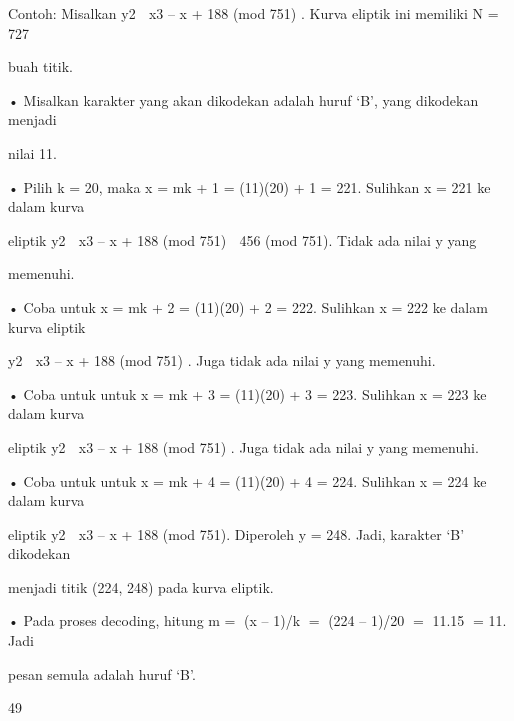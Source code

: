 \documentclass{article}
\begin{document}

Contoh: Misalkan y2  x3 – x  + 188  (mod 751) . Kurva eliptik ini memiliki N = 727 

buah titik. 

• Misalkan karakter yang akan dikodekan adalah huruf ‘B’, yang dikodekan menjadi 

nilai 11. 

• Pilih k = 20, maka x = mk + 1 = (11)(20) + 1 = 221. Sulihkan x = 221 ke dalam kurva 

eliptik y2  x3 – x  + 188  (mod 751)  456 (mod 751). Tidak ada nilai y yang 

memenuhi. 

• Coba untuk x = mk + 2 = (11)(20) + 2 = 222. Sulihkan x = 222 ke dalam kurva eliptik 

y2  x3 – x  + 188  (mod 751) . Juga tidak ada nilai y yang memenuhi. 

• Coba untuk untuk x = mk + 3 = (11)(20) + 3 = 223. Sulihkan x = 223 ke dalam kurva 

eliptik y2  x3 – x  + 188  (mod 751) . Juga tidak ada nilai y yang memenuhi. 

• Coba untuk untuk x = mk + 4 = (11)(20) + 4 = 224. Sulihkan x = 224 ke dalam kurva 

eliptik y2  x3 – x  + 188  (mod 751). Diperoleh y =  248. Jadi, karakter ‘B’ dikodekan 

menjadi titik (224, 248) pada kurva eliptik. 

• Pada proses decoding, hitung m = (x – 1)/k = (224 – 1)/20 = 11.15 = 11. Jadi 

pesan semula adalah huruf ‘B’.

49
\end{document}
